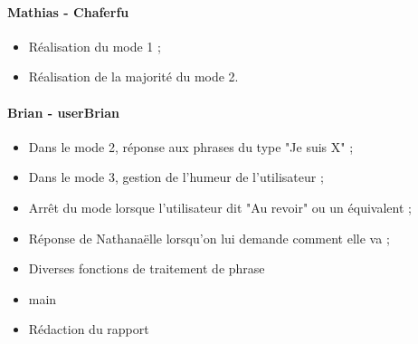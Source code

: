 \documentclass[paper=a4, fontsize=11pt]{article}
\begin{document}
\paragraph{Mathias - Chaferfu} 
\begin{itemize}
\item Réalisation du mode 1 ;
\item Réalisation de la majorité du mode 2.
\end{itemize}

\paragraph{Brian - userBrian} 
\begin{itemize}
\item Dans le mode 2, réponse aux phrases du type "Je suis X" ;
\item Dans le mode 3, gestion de l'humeur de l'utilisateur ;
\item Arrêt du mode lorsque l'utilisateur dit "Au revoir" ou un équivalent ;
\item Réponse de Nathanaëlle lorsqu'on lui demande comment elle va ;
\item Diverses fonctions de traitement de phrase
\item main
\item Rédaction du rapport
\end{itemize}
\end{document}
